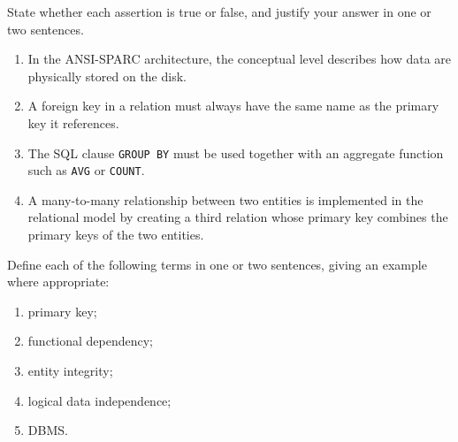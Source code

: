 \documentclass[11pt]{article}
\newcommand{\cle}[1]{{\popxbold\color{popdark}#1}}
\begin{document}
\begin{exercice}
State whether each assertion is true or false, and justify your answer in one or two sentences.
\begin{enumerate}
\item In the ANSI-SPARC architecture, the conceptual level describes how data are physically stored on the disk.
\item A foreign key in a relation must always have the same name as the primary key it references.
\item The SQL clause \texttt{GROUP BY} must be used together with an aggregate function such as \texttt{AVG} or \texttt{COUNT}.
\item A many-to-many relationship between two entities is implemented in the relational model by creating a third relation whose primary key combines the primary keys of the two entities.
\end{enumerate}
\end{exercice}

\begin{exercice}
Define each of the following terms in one or two sentences, giving an example where appropriate:
\begin{enumerate}
\item \cle{primary key};
\item \cle{functional dependency};
\item \cle{entity integrity};
\item \cle{logical data independence};
\item \cle{DBMS}.
\end{enumerate}
\end{exercice}
\end{document}

